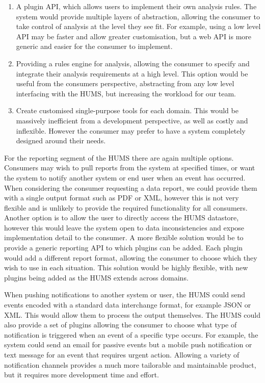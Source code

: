 \documentclass[10pt,a4paper]{article}
\begin{document}
\begin{enumerate}
	\item A plugin API, which allows users to implement their own analysis rules.
	      The system would provide multiple layers of abstraction, allowing the
	      consumer to take control of analysis at the level they see fit. For
	      example, using a low level API may be faster and allow greater
	      customisation, but a web API is more generic and easier for the consumer
	      to implement.
	\item Providing a rules engine for analysis, allowing the consumer to specify
	      and integrate their analysis requirements at a high level. This option
	      would be useful from the consumers perspective, abstracting from any low
	      level interfacing with the HUMS, but increasing the workload for our
	      team.
	\item Create customised single-purpose tools for each domain. This would be
	      massively inefficient from a development perspective, as well as costly
	      and inflexible. However the consumer may prefer to have a system
	      completely designed around their needs.
\end{enumerate}

For the reporting segment of the HUMS there are again multiple options.
Consumers may wish to pull reports from the system at specified times, or want
the system to notify another system or end user when an event has occurred. When
considering the consumer requesting a data report, we could provide them with a
single output format such as PDF or XML, however this is not very flexible and
is unlikely to provide the required functionality for all consumers. Another
option is to allow the user to directly access the HUMS datastore, however this
would leave the system open to data inconsistencies and expose implementation
detail to the consumer. A more flexible solution would be to provide a generic
reporting API to which plugins can be added. Each plugin would add a different
report format, allowing the consumer to choose which they wish to use in each
situation. This solution would be highly flexible, with new plugins being added
as the HUMS extends across domains.

When pushing notifications to another system or user, the HUMS could send events
encoded with a standard data interchange format, for example JSON or XML. This
would allow them to process the output themselves. The HUMS could also provide a
set of plugins allowing the consumer to choose what type of notification is
triggered when an event of a specific type occurs. For example, the system could
send an email for passive events but a mobile push notification or text message
for an event that requires urgent action. Allowing a variety of notification
channels provides a much more tailorable and maintainable product, but it
requires more development time and effort.
\end{document}
